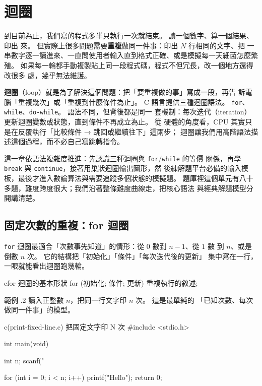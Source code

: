 \chapter{迴圈}
\label{ch:loop}

到目前為止，我們寫的程式多半只執行一次就結束。 讀一個數字、算一個結果、印出
來。 但實際上很多問題需要\textbf{重複}做同一件事：印出 $N$ 行相同的文字、把
一串數字逐一讀進來、一直問使用者輸入直到格式正確、或是模擬每一天細菌怎麼繁殖。
如果每一輪都手動複製貼上同一段程式碼，程式不但冗長，改一個地方還得改很多
處，幾乎無法維護。

\textbf{迴圈}（loop）就是為了解決這個問題：把「要重複做的事」寫成一段，再告
訴電腦「重複幾次」或「重複到什麼條件為止」。 C 語言提供三種迴圈語法。 
\texttt{for}、\texttt{while}、\texttt{do-while}。 語法不同，但背後都是同一
套機制：每次迭代（iteration）更新迴圈變數或狀態，直到條件不再成立為止。 從
硬體的角度看，CPU 其實只是在反覆執行「比較條件 → 跳回或繼續往下」這兩步；
迴圈讓我們用高階語法描述這個過程，而不必自己寫跳轉指令。

這一章依語法複雜度推進：先認識三種迴圈與 \texttt{for}/\texttt{while} 的等價
關係，再學 \texttt{break} 與 \texttt{continue}，接著用巢狀迴圈輸出圖形，然
後練解題平台必備的輸入模板，最後才進入數論算法與需要追蹤多個狀態的模擬題。
題庫裡這個單元有八十多題，難度跨度很大；我們沿著整條難度曲線走，把核心語法
與經典解題模型分開講清楚。

\section{固定次數的重複：for 迴圈}
\label{sec:loop-for-basics}

\texttt{for} 迴圈最適合「次數事先知道」的情形：從 $0$ 數到 $n-1$、從 $1$ 數
到 $n$、或是倒數 $n$ 次。 它的結構把「初始化」「條件」「每次迭代後的更新」
集中寫在一行，一眼就能看出迴圈跑幾輪。

\begin{code}{c}{for 迴圈的基本形狀}
for (初始化; 條件; 更新) {
    重複執行的敘述;
}
\end{code}

範例 \thechapter.2 讀入正整數 $n$，把同一行文字印 $n$ 次。 這是最單純的
「已知次數、每次做同一件事」的模型。

\begin{example}{c}{(print-fixed-line.c) 把固定文字印 N 次}
#include <stdio.h>

int main(void) {
    int n;
    scanf("%

    for (int i = 0; i < n; i++) {
        printf("Hello\n");
    }
    return 0;
}
\end{example}

